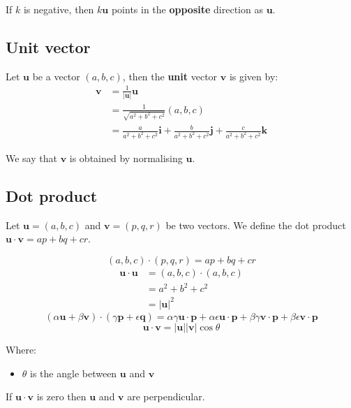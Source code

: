 \documentclass[11pt]{article}
\begin{document}
If \(k\) is negative, then \(k \boldsymbol{u}\) points in the \textbf{opposite} direction as \(\boldsymbol{u}\).
\subsection{Unit vector}
\label{sec:orgc7bdde8}
Let \(\boldsymbol{u}\) be a vector \((a, b, c)\), then the \textbf{unit} vector \(\boldsymbol{v}\) is given by:
\begin{align*}
\boldsymbol{v} &= \frac{1}{|\boldsymbol{u}|} \boldsymbol{u} \\
&= \frac{1}{\sqrt{a^2 + b^2 + c^2}} (a, b, c) \\
&= \frac{a}{a^2 + b^2 + c^2} \boldsymbol{i} + \frac{b}{a^2 + b^2 + c^2} \boldsymbol{j} + \frac{c}{a^2 + b^2 + c^2} \boldsymbol{k}
\end{align*}

We say that \(\boldsymbol{v}\) is obtained by normalising \(\boldsymbol{u}\).
\subsection{Dot product}
\label{sec:orgdc3f792}
Let \(\boldsymbol{u} = (a, b, c)\) and \(\boldsymbol{v} = (p, q, r)\) be two vectors. We define the dot product \(\boldsymbol{u} \cdot \boldsymbol{v} = ap + bq + cr\).

\[(a, b, c) \cdot (p, q, r) = ap + bq + cr\]
\begin{align*}
\boldsymbol{u} \cdot \boldsymbol{u} &= (a, b, c) \cdot (a, b, c) \\
&= a^2 + b^2 + c^2 \\
&= | \boldsymbol{u} |^2
\end{align*}
\[(\alpha \boldsymbol{u} + \beta \boldsymbol{v}) \cdot (\gamma \boldsymbol{p} + \epsilon \boldsymbol{q}) = \alpha \gamma \boldsymbol{u} \cdot \boldsymbol{p} + \alpha \epsilon \boldsymbol{u} \cdot \boldsymbol{p} + \beta \gamma \boldsymbol{v} \cdot \boldsymbol{p} + \beta \epsilon \boldsymbol{v} \cdot \boldsymbol{p}\]
\[\boldsymbol{u} \cdot \boldsymbol{v} = | \boldsymbol{u} | | \boldsymbol{v} | \cos \theta\]

Where:
\begin{itemize}
\item \(\theta\) is the angle between \(\boldsymbol{u}\) and \(\boldsymbol{v}\)
\end{itemize}

If \(\boldsymbol{u} \cdot \boldsymbol{v}\) is zero then \(\boldsymbol{u}\) and \(\boldsymbol{v}\) are perpendicular.
\end{document}
